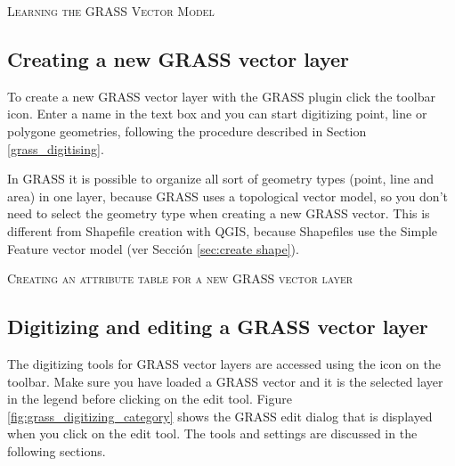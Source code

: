 \begin{Tip}\caption{\textsc{Learning the GRASS Vector Model}}
\end{Tip} 

\subsection{Creating a new GRASS vector layer}\label{sec:creating_new_grass_vectors}

To create a new GRASS vector layer with the GRASS plugin click the 
 toolbar icon. 
Enter a name in the text box and you can start digitizing point, line or 
polygone geometries, following the procedure described in Section 
\ref{grass_digitising}. 

In GRASS it is possible to organize all sort of geometry types (point, line 
and area) in one layer, because GRASS uses a topological vector model, so you 
don't need to select the geometry type when creating a new GRASS vector. This 
is different from Shapefile creation with QGIS, because Shapefiles use the 
Simple Feature vector model (ver Sección \ref{sec:create shape}).

\begin{Tip}\caption{\textsc{Creating an attribute table for a new GRASS vector layer}}
\end{Tip} 

\subsection{Digitizing and editing a GRASS vector layer}\label{grass_digitising}

The digitizing tools for GRASS vector layers are accessed using the
 icon on the toolbar. Make 
sure you have loaded a GRASS vector and it is the selected layer in the legend 
before clicking on the edit tool. Figure \ref{fig:grass_digitizing_category} 
shows the GRASS edit dialog that is displayed when you click on the edit tool. 
The tools and settings are discussed in the following sections.

